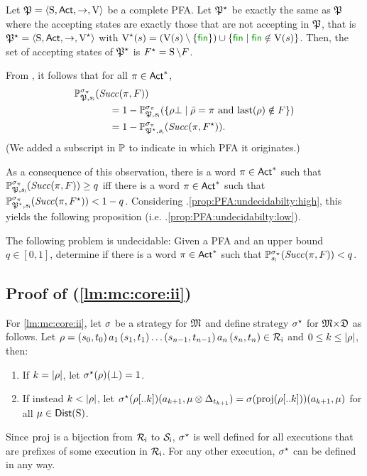Let $\pfa=\tup{\S,\Act,\ra,\V}$ be a complete PFA.  Let $\pfa^\star$
be exactly the same as $\pfa$ where the accepting states are exactly
those that are not accepting in $\pfa$, that is
$\pfa^\star=\tup{\S,\Act,\ra,\V^\star}$ with
$\V^\star(s)=(\V(s)\setminus\{\fin\})\cup\{\fin\mid{\fin\notin\V(s)}\}$.
%
Then, the set of accepting states of $\pfa^\star$ is
$F^\star=\S\setminus F$.

From , it follows that for all $\plan\in\Act^*$,
%
\begin{align*}
  \Prob_{\pfa,\sini}^{\strat_\plan}(\Succ(\plan,F)) \hspace{-4em} & \\
  &  =
  1 - \Prob_{\pfa,\sini}^{\strat_\plan}(\{{\rho\complete}\mid{\bar{\rho}=\plan \text{ and } \last(\rho)\notin F}\}) \\
  & =
  1 - \Prob_{\pfa^\star,\sini}^{\strat_\plan}(\Succ(\plan,F^\star)).
\end{align*}
%
(We added a subscript in $\Prob$ to indicate in which PFA it
originates.)

As a consequence of this observation,
there is a word $\plan\in\Act^*$ such that
$\Prob_{\pfa,\sini}^{\strat_\plan}(\Succ(\plan,F)) \geq q$
%
iff there is a word $\plan\in\Act^*$ such that
$\Prob_{\pfa^\star,\sini}^{\strat_\plan}(\Succ(\plan,F^\star)) < 1-q$.
%
Considering
.\ref{prop:PFA:undecidabilty:high}, this
yields the following proposition
(i.e. .\ref{prop:PFA:undecidabilty:low}).

\begin{proposition}
  The following problem is undecidable:
  Given a PFA and an upper bound $q\in[0,1]$, determine if there is a
  word $\plan\in\Act^*$ such that
  $\Prob_{\sini}^{\strat_\plan}(\Succ(\plan,F)) < q$.
\end{proposition}


\subsection{Proof of  (\cref{lm:mc:core:ii})}

For \cref{lm:mc:core:ii}, let $\strat$ be a strategy for
$\model$ and define strategy $\strat^\star$ for
$\model{\times}\dfa$ as follows.
%
Let
$\rho=(s_0,t_0)\, a_1\, (s_1,t_1)\ldots (s_{n-1},t_{n-1})\, a_n\, (s_n,t_n)\in\setRini$
and $0\leq k\leq\size{\rho}$, then:
%
\begin{enumerate}
\item%
  If $k=\size{\rho}$, let $\strat^\star(\rho)(\complete)=1$.
\item%
  If instead $k<\size{\rho}$, let
  $\strat^\star(\rho[..k])(a_{k+1},\mu\otimes\Dirac_{t_{k+1}})=\strat(\proj(\rho[..k]))(a_{k+1},\mu)$
  for all $\mu\in\Dist(\S)$.
\end{enumerate}
%
Since $\proj$ is a bijection from $\setRini$ to $\setSini$, 
$\strat^\star$ is well defined for all executions that are prefixes of
some execution in $\setRini$.
%
For any other execution, $\strat^\star$ can be defined in any way.

